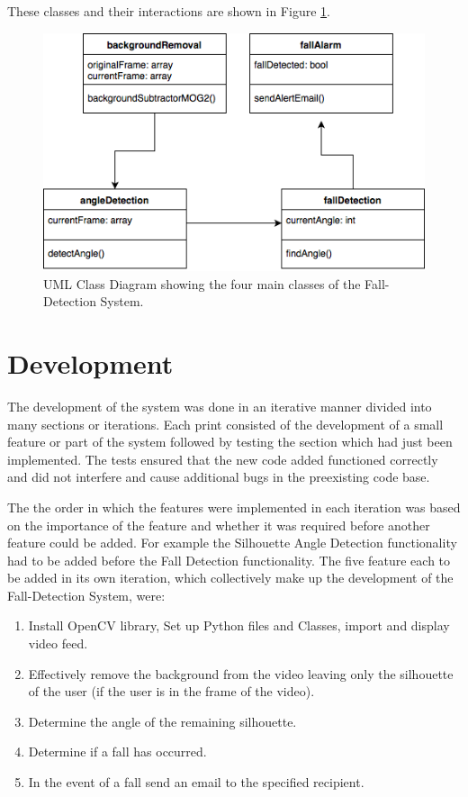 \documentclass[11pt,a4paper]{report}
\begin{document}
These classes and their interactions are shown in Figure \ref{fig:UMLClassDiagram}.

\begin{figure}[H]
 \centering
 \includegraphics[scale = 0.5]{UMLClassDiagram.png}
 \caption{UML Class Diagram showing the four main classes of the Fall-Detection System.}
 \label{fig:UMLClassDiagram}
\end{figure}

\pagebreak

\section{Development}
The development of the system was done in an iterative manner divided into many sections or iterations. Each print consisted of the development of a small feature or part of the system followed by testing the section which had just been implemented. The tests ensured that the new code added functioned correctly and did not interfere and cause additional bugs in the preexisting code base.

The the order in which the features were implemented in each iteration was based on the importance of the feature and whether it was required before another feature could be added. For example the Silhouette Angle Detection functionality had to be added before the Fall Detection functionality. The five feature each to be added in its own iteration, which collectively make up the development of the Fall-Detection System, were:

\begin{enumerate}
\item Install OpenCV library, Set up Python files and Classes, import and display video feed.
\item Effectively remove the background from the video leaving only the silhouette of the user (if the user is in the frame of the video).
\item Determine the angle of the remaining silhouette.
\item Determine if a fall has occurred.
\item In the event of a fall send an email to the specified recipient.
\end{enumerate}
\end{document}
